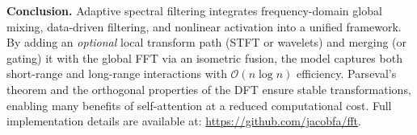 \bigskip

\noindent
\textbf{Conclusion.} 
Adaptive spectral filtering integrates frequency-domain global mixing, data-driven filtering, and nonlinear activation into a unified framework. By adding an \emph{optional} local transform path (STFT or wavelets) and merging (or gating) it with the global FFT via an isometric fusion, the model captures both short-range and long-range interactions with \(\mathcal{O}(n \log n)\) efficiency. Parseval’s theorem and the orthogonal properties of the DFT ensure stable transformations, enabling many benefits of self-attention at a reduced computational cost. Full implementation details are available at: 
\url{https://github.com/jacobfa/fft}.
